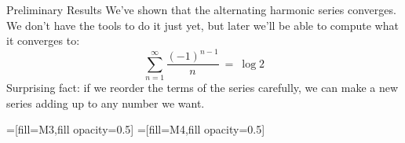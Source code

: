 \begin{frame}[t]{Preliminary Results}
We've shown that the alternating harmonic series converges. We don't have the tools to do it just yet, but later we'll be able to compute what it converges to:
\[\sum_{n=1}^\infty \frac{(-1)^{n-1}}{n} \ = \ \log 2\]
\pause
\vfill
Surprising fact: if we reorder the terms of the series carefully, we can make a new series adding up to any number we want.
\end{frame}
=[fill=M3,fill opacity=0.5]
=[fill=M4,fill opacity=0.5]

\newcommand{\cacheRect}[1]{%
	\COPY{#1}{\cachen}
	\ifodd \cachen
		\ifnum \cachen < 37 \draw[po] (\cachen/6,0) rectangle +(.2,1/\cachen);
		\draw(\cachen/6+.1,0)node[below]{$\frac{1}{\cachen}$};\fi
		\else
		\ifnum \cachen < 32\draw[ne] (6+\cachen/6,0) rectangle +(.2,-1/\cachen);
		\draw(\cachen/6+6.1,0)node[above]{\small$\frac{\text{-} 1}{\cachen}$};\fi
		\fi
	}
\newcommand{\usedRect}[1]{%
	\COPY{#1}{\cachen}
	\begin{scope}[opacity=0.1]
	\ifodd \cachen
		\ifnum \cachen < 37\draw[po,fill opacity=0.1] (\cachen/6,0) rectangle +(.2,1/\cachen);
		\draw(\cachen/6+.1,0)node[below]{$\frac{1}{\cachen}$};\fi
		\else
		\ifnum \cachen < 32 \draw[ne,fill opacity=0.1] (6+\cachen/6,0) rectangle +(.2,-1/\cachen);
		\draw(\cachen/6+6.1,0)node[above]{\small$\frac{\text{-}1}{\cachen}$};\fi
		\fi
	\end{scope}
	}

